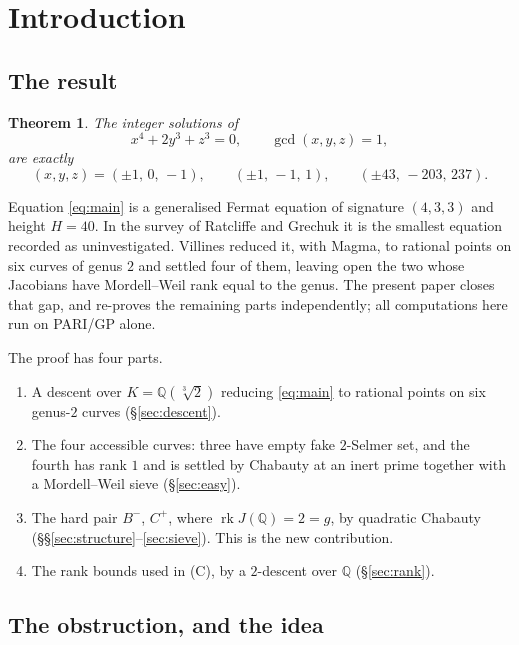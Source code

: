 \documentclass[11pt,reqno]{amsart}
\theoremstyle{plain}
\newtheorem{theorem}{Theorem}[section]
\theoremstyle{definition}
\newcommand{\Q}{\mathbb{Q}}
\DeclareMathOperator{\rk}{rk}
\numberwithin{equation}{section}
\begin{document}
\section{Introduction}

\subsection{The result}

\begin{theorem}\label{thm:main}
The integer solutions of
\begin{equation}\label{eq:main}
  x^{4}+2y^{3}+z^{3}=0, \qquad \gcd(x,y,z)=1,
\end{equation}
are exactly
\[
  (x,y,z)=(\pm1,\,0,\,-1),\qquad (\pm1,\,-1,\,1),\qquad (\pm43,\,-203,\,237).
\]
\end{theorem}

Equation \eqref{eq:main} is a generalised Fermat equation of signature
$(4,3,3)$ and height $H=40$. In the survey of Ratcliffe and Grechuk
\cite{RatcliffeGrechuk} it is the smallest equation recorded as
uninvestigated. Villines \cite{Villines} reduced it, with Magma, to rational
points on six curves of genus $2$ and settled four of them, leaving open the
two whose Jacobians have Mordell--Weil rank equal to the genus. The present
paper closes that gap, and re-proves the remaining parts independently; all
computations here run on PARI/GP alone.

The proof has four parts.
\begin{enumerate}[label=(\Alph*),leftmargin=2.4em]
\item A descent over $K=\Q(\sqrt[3]{2})$ reducing \eqref{eq:main} to rational
      points on six genus-$2$ curves (\S\ref{sec:descent}).
\item The four accessible curves: three have empty fake $2$-Selmer set, and the
      fourth has rank $1$ and is settled by Chabauty at an inert prime together
      with a Mordell--Weil sieve (\S\ref{sec:easy}).
\item The hard pair $B^{-}$, $C^{+}$, where $\rk J(\Q)=2=g$, by quadratic
      Chabauty (\S\S\ref{sec:structure}--\ref{sec:sieve}). This is the new
      contribution.
\item The rank bounds used in (C), by a $2$-descent over $\Q$
      (\S\ref{sec:rank}).
\end{enumerate}

\subsection{The obstruction, and the idea}
\end{document}
